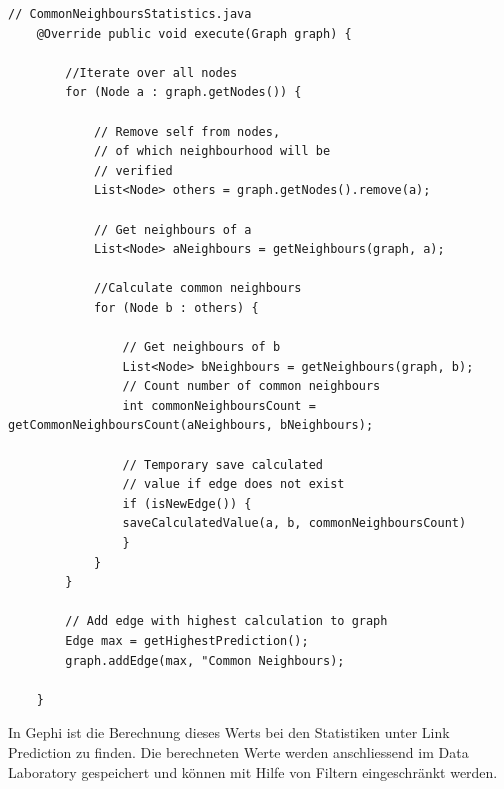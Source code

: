 \begin{lstlisting}[caption={Common neighbour implementation},label=lstCommonNeighbour]
    // CommonNeighboursStatistics.java
    @Override public void execute(Graph graph) {

        //Iterate over all nodes
        for (Node a : graph.getNodes()) {

            // Remove self from nodes,
            // of which neighbourhood will be
            // verified
            List<Node> others = graph.getNodes().remove(a);

            // Get neighbours of a
            List<Node> aNeighbours = getNeighbours(graph, a);

            //Calculate common neighbours
            for (Node b : others) {

                // Get neighbours of b
                List<Node> bNeighbours = getNeighbours(graph, b);
                // Count number of common neighbours
                int commonNeighboursCount = getCommonNeighboursCount(aNeighbours, bNeighbours);

                // Temporary save calculated
                // value if edge does not exist
                if (isNewEdge()) {
                saveCalculatedValue(a, b, commonNeighboursCount)
                }
            }
        }

        // Add edge with highest calculation to graph
        Edge max = getHighestPrediction();
        graph.addEdge(max, "Common Neighbours);

    }
\end{lstlisting}

In Gephi ist die Berechnung dieses Werts bei den Statistiken unter Link Prediction zu finden. Die berechneten Werte
werden anschliessend im Data Laboratory gespeichert und können mit Hilfe von Filtern eingeschränkt werden.

